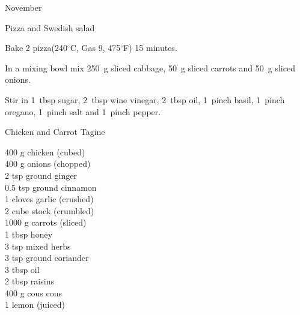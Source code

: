 \begin{menu}{November}
\begin{recipe}{1}{Pizza and Swedish salad}
\begin{ingredients}
		\end{ingredients}
	
	
	
    \begin{instructions}
    \item 
        Bake 2  pizza(240$^{\circ}$C, Gas 9, 475$^{\circ}$F) 15 minutes.
      \item 
        In a mixing bowl mix
        250~g sliced cabbage,
        50~g sliced carrots
        and
        50~g sliced onions.
      \item 
        Stir in
        1~tbsp  sugar,
        2~tbsp  wine vinegar,
        2~tbsp  oil,
        1~pinch  basil,
        1~pinch  oregano,
        1~pinch  salt
        and
        1~pinch  pepper.
      
    \end{instructions}
    \end{recipe}%
  
    \begin{recipe}{2}{Chicken and Carrot Tagine}%
		\begin{ingredients}
		400 g chicken (cubed) \\
	400 g onions (chopped) \\
	2 tsp ground ginger  \\
	0.5 tsp ground cinnamon  \\
	1 cloves garlic (crushed) \\
	2 cube stock (crumbled) \\
	1000 g carrots (sliced) \\
	1 tbsp honey  \\
	3 tsp mixed herbs  \\
	3 tsp ground coriander  \\
	3 tbsp oil  \\
	2 tbsp raisins  \\
	400 g cous cous  \\
	1  lemon (juiced) \\
	
		\end{ingredients}
	
	

\end{recipe}
\end{menu}
